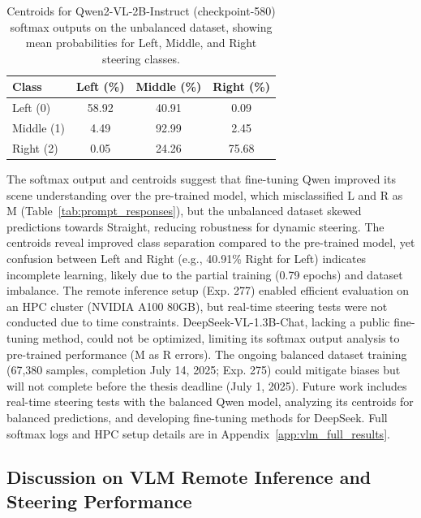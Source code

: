 \begin{table}[ht]
\centering
\begin{tabular}{@{}lccc@{}}
\toprule
Class & Left (\%) & Middle (\%) & Right (\%) \\
\midrule
Left (0) & 58.92 & 40.91 & 0.09 \\
Middle (1) & 4.49 & 92.99 & 2.45 \\
Right (2) & 0.05 & 24.26 & 75.68 \\
\bottomrule
\end{tabular}
\caption{Centroids for Qwen2-VL-2B-Instruct (checkpoint-580) softmax outputs on the unbalanced dataset, showing mean probabilities for Left, Middle, and Right steering classes.}
\label{tab:qwen_centroids}
\end{table}

The softmax output and centroids suggest that fine-tuning Qwen improved its scene understanding over the pre-trained model, which misclassified L and R as M (Table~\ref{tab:prompt_responses}), but the unbalanced dataset skewed predictions towards Straight, reducing robustness for dynamic steering. The centroids reveal improved class separation compared to the pre-trained model, yet confusion between Left and Right (e.g., 40.91\% Right for Left) indicates incomplete learning, likely due to the partial training (0.79 epochs) and dataset imbalance. The remote inference setup (Exp. 277) enabled efficient evaluation on an HPC cluster (NVIDIA A100 80GB), but real-time steering tests were not conducted due to time constraints. DeepSeek-VL-1.3B-Chat, lacking a public fine-tuning method, could not be optimized, limiting its softmax output analysis to pre-trained performance (M as R errors). The ongoing balanced dataset training (67,380 samples, completion July 14, 2025; Exp. 275) could mitigate biases but will not complete before the thesis deadline (July 1, 2025). Future work includes real-time steering tests with the balanced Qwen model, analyzing its centroids for balanced predictions, and developing fine-tuning methods for DeepSeek. Full softmax logs and HPC setup details are in Appendix~\ref{app:vlm_full_results}.


\subsection{Discussion on VLM Remote Inference and Steering Performance}
\label{subsec:vlm_remote_inference}

